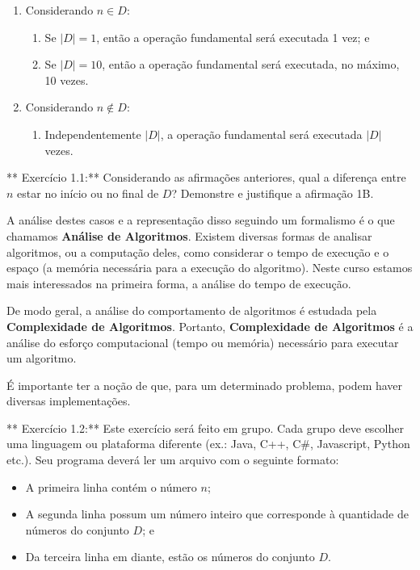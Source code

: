 \documentclass{article}
\begin{document}
\begin{enumerate}
\def\labelenumi{\arabic{enumi}.}
\itemsep1pt\parskip0pt
\item
  Considerando \(n \in D\):

  \begin{enumerate}
  \def\labelenumii{\arabic{enumii}.}
  \itemsep1pt\parskip0pt
  \item
    Se \(|D| = 1\), então a operação fundamental será executada 1 vez; e
  \item
    Se \(|D| = 10\), então a operação fundamental será executada, no
    máximo, 10 vezes.
  \end{enumerate}
\item
  Considerando \(n \not\in D\):

  \begin{enumerate}
  \def\labelenumii{\arabic{enumii}.}
  \itemsep1pt\parskip0pt
  \item
    Independentemente \(|D|\), a operação fundamental será executada
    \(|D|\) vezes.
  \end{enumerate}
\end{enumerate}

** Exercício 1.1:** Considerando as afirmações anteriores, qual a
diferença entre \(n\) estar no início ou no final de \(D\)? Demonstre e
justifique a afirmação 1B.

A análise destes casos e a representação disso seguindo um formalismo é
o que chamamos \textbf{Análise de Algoritmos}. Existem diversas formas
de analisar algoritmos, ou a computação deles, como considerar o tempo
de execução e o espaço (a memória necessária para a execução do
algoritmo). Neste curso estamos mais interessados na primeira forma, a
análise do tempo de execução.

De modo geral, a análise do comportamento de algoritmos é estudada pela
\textbf{Complexidade de Algoritmos}. Portanto, \textbf{Complexidade de
Algoritmos} é a análise do esforço computacional (tempo ou memória)
necessário para executar um algoritmo.

É importante ter a noção de que, para um determinado problema, podem
haver diversas implementações.

** Exercício 1.2:** Este exercício será feito em grupo. Cada grupo deve
escolher uma linguagem ou plataforma diferente (ex.: Java, C++, C\#,
Javascript, Python etc.). Seu programa deverá ler um arquivo com o
seguinte formato:

\begin{itemize}
\itemsep1pt\parskip0pt
\item
  A primeira linha contém o número \(n\);
\item
  A segunda linha possum um número inteiro que corresponde à quantidade
  de números do conjunto \(D\); e
\item
  Da terceira linha em diante, estão os números do conjunto \(D\).
\end{itemize}
\end{document}
